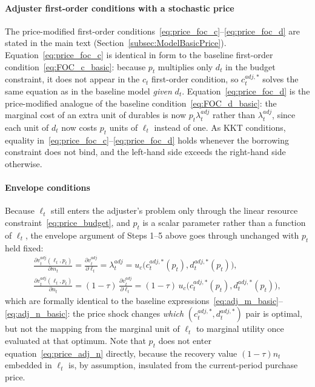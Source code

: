 \paragraph{Adjuster first-order conditions with a stochastic price}
The price-modified first-order conditions~\eqref{eq:price_foc_c}--\eqref{eq:price_foc_d} are stated in the main text (Section~\ref{subsec:ModelBasicPrice}). Equation~\eqref{eq:price_foc_c} is identical in form to the baseline first-order condition~\eqref{eq:FOC_c_basic}: because $p_t$ multiplies only $d_t$ in the budget constraint, it does not appear in the $c_t$ first-order condition, so $c_t^{adj,\ast}$ solves the same equation as in the baseline model \emph{given} $d_t$. Equation~\eqref{eq:price_foc_d} is the price-modified analogue of the baseline condition~\eqref{eq:FOC_d_basic}: the marginal cost of an extra unit of durables is now $p_t\lambda_t^{adj}$ rather than $\lambda_t^{adj}$, since each unit of $d_t$ now costs $p_t$ units of $\ell_t$ instead of one. As KKT conditions, equality in~\eqref{eq:price_foc_c}--\eqref{eq:price_foc_d} holds whenever the borrowing constraint does not bind, and the left-hand side exceeds the right-hand side otherwise.

\paragraph{Envelope conditions}
Because $\ell_t$ still enters the adjuster's problem only through the linear resource constraint~\eqref{eq:price_budget}, and $p_t$ is a scalar parameter rather than a function of $\ell_t$, the envelope argument of Steps 1--5 above goes through unchanged with $p_t$ held fixed:
\begin{align}
	\frac{\partial v_t^{adj}(\ell_t,p_t)}{\partial m_t} = \frac{\partial v_t^{adj}}{\partial \ell_t} = \lambda_t^{adj} = u_c\big(c_t^{adj,\ast}(p_t),d_t^{adj,\ast}(p_t)\big), \label{eq:price_adj_m}\\
	\frac{\partial v_t^{adj}(\ell_t,p_t)}{\partial n_t} = (1-\tau)\,\frac{\partial v_t^{adj}}{\partial \ell_t} = (1-\tau)\,u_c\big(c_t^{adj,\ast}(p_t),d_t^{adj,\ast}(p_t)\big), \label{eq:price_adj_n}
\end{align}
which are formally identical to the baseline expressions~\eqref{eq:adj_m_basic}--\eqref{eq:adj_n_basic}: the price shock changes \emph{which} $(c_t^{adj,\ast},d_t^{adj,\ast})$ pair is optimal, but not the mapping from the marginal unit of $\ell_t$ to marginal utility once evaluated at that optimum. Note that $p_t$ does not enter equation~\eqref{eq:price_adj_n} directly, because the recovery value $(1-\tau)n_t$ embedded in $\ell_t$ is, by assumption, insulated from the current-period purchase price.


